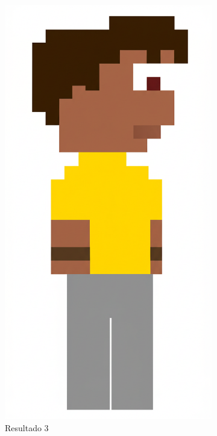 \begin{figure}[htbp]
\begin{subfigure}{0.23\linewidth}
        \includegraphics[width=1\linewidth]{figs/geminiPro/chat5/tela1_res2.PNG}
        \caption{\small Resultado 3}
        \label{fig:geminiPro7c}
    \end{subfigure}
    \begin{subfigure}{0.23\linewidth}

\end{subfigure}
\end{figure}
